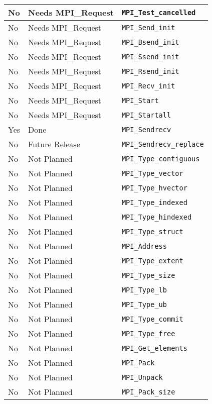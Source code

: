 \documentclass{report}
\begin{document}
\begin{tabular}{|l|l|l|}
No             & Needs MPI\_Request & \verb|MPI_Test_cancelled| \\ \hline
No             & Needs MPI\_Request & \verb|MPI_Send_init| \\ \hline
No             & Needs MPI\_Request & \verb|MPI_Bsend_init| \\ \hline
No             & Needs MPI\_Request & \verb|MPI_Ssend_init| \\ \hline
No             & Needs MPI\_Request & \verb|MPI_Rsend_init| \\ \hline
No             & Needs MPI\_Request & \verb|MPI_Recv_init| \\ \hline
No             & Needs MPI\_Request & \verb|MPI_Start| \\ \hline
No             & Needs MPI\_Request & \verb|MPI_Startall| \\ \hline
Yes            & Done               & \verb|MPI_Sendrecv| \\ \hline
No             & Future Release     & \verb|MPI_Sendrecv_replace| \\ \hline
No             & Not Planned        & \verb|MPI_Type_contiguous| \\ \hline
No             & Not Planned        & \verb|MPI_Type_vector| \\ \hline
No             & Not Planned        & \verb|MPI_Type_hvector| \\ \hline
No             & Not Planned        & \verb|MPI_Type_indexed| \\ \hline
No             & Not Planned        & \verb|MPI_Type_hindexed| \\ \hline
No             & Not Planned        & \verb|MPI_Type_struct| \\ \hline
No             & Not Planned        & \verb|MPI_Address| \\ \hline
No             & Not Planned        & \verb|MPI_Type_extent| \\ \hline
No             & Not Planned        & \verb|MPI_Type_size| \\ \hline
No             & Not Planned        & \verb|MPI_Type_lb| \\ \hline
No             & Not Planned        & \verb|MPI_Type_ub| \\ \hline
No             & Not Planned        & \verb|MPI_Type_commit| \\ \hline
No             & Not Planned        & \verb|MPI_Type_free| \\ \hline
No             & Not Planned        & \verb|MPI_Get_elements| \\ \hline
No             & Not Planned        & \verb|MPI_Pack| \\ \hline
No             & Not Planned        & \verb|MPI_Unpack| \\ \hline
No             & Not Planned        & \verb|MPI_Pack_size| \\ \hline
\end{tabular}
\end{document}
